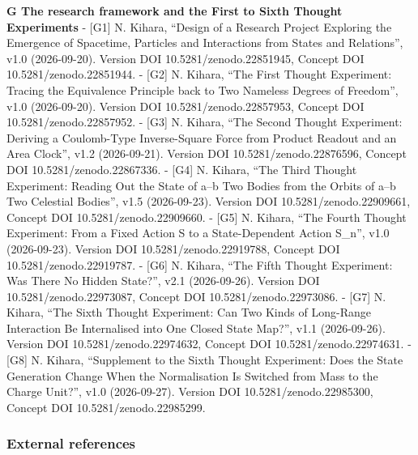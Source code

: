 \documentclass[
  a4paper,
]{article}
\begin{document}
\textbf{G The research framework and the First to Sixth Thought
Experiments} - {[}G1{]} N. Kihara, ``Design of a Research Project
Exploring the Emergence of Spacetime, Particles and Interactions from
States and Relations'', v1.0 (2026-09-20). Version DOI
10.5281/zenodo.22851945, Concept DOI 10.5281/zenodo.22851944. - {[}G2{]}
N. Kihara, ``The First Thought Experiment: Tracing the Equivalence
Principle back to Two Nameless Degrees of Freedom'', v1.0 (2026-09-20).
Version DOI 10.5281/zenodo.22857953, Concept DOI
10.5281/zenodo.22857952. - {[}G3{]} N. Kihara, ``The Second Thought
Experiment: Deriving a Coulomb-Type Inverse-Square Force from Product
Readout and an Area Clock'', v1.2 (2026-09-21). Version DOI
10.5281/zenodo.22876596, Concept DOI 10.5281/zenodo.22867336. - {[}G4{]}
N. Kihara, ``The Third Thought Experiment: Reading Out the State of a--b
Two Bodies from the Orbits of a--b Two Celestial Bodies'', v1.5
(2026-09-23). Version DOI 10.5281/zenodo.22909661, Concept DOI
10.5281/zenodo.22909660. - {[}G5{]} N. Kihara, ``The Fourth Thought
Experiment: From a Fixed Action S to a State-Dependent Action S\_n'',
v1.0 (2026-09-23). Version DOI 10.5281/zenodo.22919788, Concept DOI
10.5281/zenodo.22919787. - {[}G6{]} N. Kihara, ``The Fifth Thought
Experiment: Was There No Hidden State?'', v2.1 (2026-09-26). Version DOI
10.5281/zenodo.22973087, Concept DOI 10.5281/zenodo.22973086. - {[}G7{]}
N. Kihara, ``The Sixth Thought Experiment: Can Two Kinds of Long-Range
Interaction Be Internalised into One Closed State Map?'', v1.1
(2026-09-26). Version DOI 10.5281/zenodo.22974632, Concept DOI
10.5281/zenodo.22974631. - {[}G8{]} N. Kihara, ``Supplement to the Sixth
Thought Experiment: Does the State Generation Change When the
Normalisation Is Switched from Mass to the Charge Unit?'', v1.0
(2026-09-27). Version DOI 10.5281/zenodo.22985300, Concept DOI
10.5281/zenodo.22985299.

\subsubsection{External references}\label{external-references}
\end{document}
